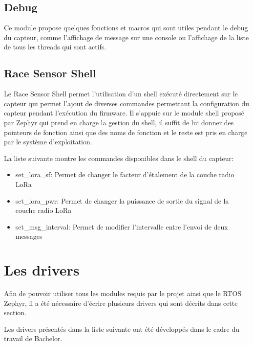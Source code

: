 \subsection{Debug}

Ce module propose quelques fonctions et macros qui sont utiles pendant le debug du capteur, comme l'affichage de message sur une console ou l'affichage de la liste de tous les threads qui sont actifs.

\subsection{Race Sensor Shell}

Le Race Sensor Shell permet l'utilisation d'un shell exécuté directement sur le capteur qui permet l'ajout de diverses commandes permettant la configuration du capteur pendant l'exécution du firmware. Il s'appuie sur le module shell proposé par Zephyr qui prend en charge la gestion du shell, il suffit de lui donner des pointeurs de fonction ainsi que des noms de fonction et le reste est pris en charge par le système d'exploitation.

La liste suivante montre les commandes disponibles dans le shell du capteur:

\begin{itemize}
\item set\_lora\_sf: Permet de changer le facteur d'étalement de la couche radio LoRa
\item set\_lora\_pwr: Permet de changer la puissance de sortie du signal de la couche radio LoRa
\item set\_msg\_interval: Permet de modifier l'intervalle entre l'envoi de deux messages
\end{itemize}

\section{Les drivers}\label{ch:drivers}

Afin de pouvoir utiliser tous les modules requis par le projet ainsi que le RTOS Zephyr, il a été nécessaire d'écrire plusieurs drivers qui sont décrits dans cette section.

Les drivers présentés dans la liste suivante ont été développés dans le cadre du travail de Bachelor.

